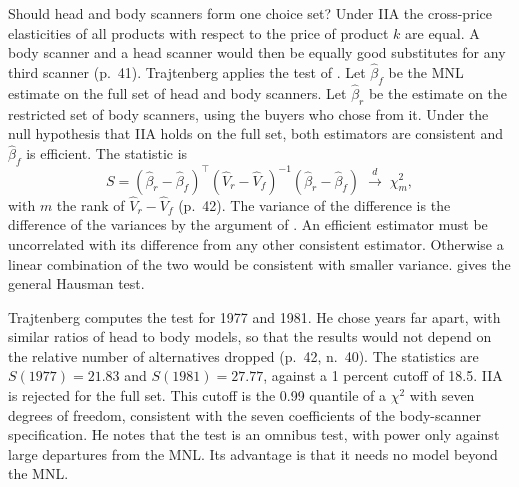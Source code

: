  Should head and body scanners form one choice set? Under
IIA the cross-price elasticities of all products with respect to the price of product $k$ are equal. A body scanner
and a head scanner would then be equally good substitutes for any third scanner (p.~41). Trajtenberg applies the
test of \citet{HausmanMcFadden1984}. Let $\hat\beta_f$ be the MNL estimate on the full set of head and body scanners.
Let $\hat\beta_r$ be the estimate on the restricted set of body scanners, using the buyers who chose from it. Under the
null hypothesis that IIA holds on the full set, both estimators are consistent and $\hat\beta_f$ is efficient. The
statistic is
\begin{equation}\label{eq:10-hm-test}
S = \left(\hat\beta_r - \hat\beta_f\right)^\top\left(\widehat V_r - \widehat V_f\right)^{-1}\left(\hat\beta_r -
\hat\beta_f\right) \;\xrightarrow{d}\; \chi^2_m,
\end{equation}
with $m$ the rank of $\widehat V_r - \widehat V_f$ (p.~42). The variance of the difference is the difference of the
variances by the argument of \citet{Hausman1978}. An efficient estimator must be uncorrelated with its difference
from any other consistent estimator. Otherwise a linear combination of the two would be consistent with smaller
variance.  gives the general Hausman test.

Trajtenberg computes the test for 1977 and 1981. He chose years far apart, with similar ratios of head to body
models, so that the results would not depend on the relative number of alternatives dropped (p.~42, n.~40). The
statistics are $S(1977) = 21.83$ and $S(1981) = 27.77$, against a 1 percent cutoff of 18.5. IIA is rejected for the
full set. This cutoff is the 0.99 quantile of a $\chi^2$ with seven degrees of freedom, consistent with the seven coefficients
of the body-scanner specification. He notes that the test is an omnibus test, with power only against large departures
from the MNL. Its advantage is that it needs no model beyond the MNL.

